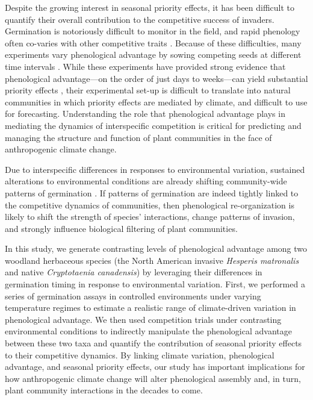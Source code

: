 \documentclass{article}[11pt]
\begin{document}
Despite the growing interest in seasonal priority effects, it has been difficult to quantify their overall contribution to the competitive success of invaders. Germination is notoriously difficult to monitor in the field, and rapid phenology often co-varies with other competitive traits \citep{Dickson2012,Milbau:2003vt,HAO:2009vh}. %
Because of these difficulties, many experiments vary phenological advantage by sowing competing seeds at different time intervals \citep{Young:2017aa}. While these experiments have provided strong evidence that phenological advantage---on the order of just days to weeks---can yield substantial priority effects \citep{Weidlich:2020aa}, their experimental set-up is difficult to translate into natural communities in which priority effects are mediated by climate, and difficult to use for forecasting. %
Understanding the role that phenological advantage plays in mediating the dynamics of interspecific competition is critical for predicting and managing the structure and function of plant communities in the face of anthropogenic climate change. 

Due  to interspecific differences in responses to environmental variation, sustained alterations to environmental conditions are already shifting community-wide patterns of germination \citep{Walck2011}. If patterns of germination are indeed tightly linked to the competitive dynamics of communities, then phenological re-organization is likely to shift the strength of species' interactions, change patterns of invasion, and strongly influence biological filtering of plant communities. 

In this study, we generate contrasting levels of phenological advantage among two woodland herbaceous species (the North American invasive \textit{Hesperis matronalis} and native \textit{Cryptotaenia canadensis}) by leveraging their differences in germination timing in response to environmental variation. First, we performed a series of germination assays in controlled environments under varying temperature regimes to estimate a realistic range of climate-driven variation in phenological advantage. %
We then used competition trials under contrasting environmental conditions to indirectly manipulate the phenological advantage between these two taxa and quantify the contribution of seasonal priority effects to their competitive dynamics. By linking climate variation, phenological advantage, and seasonal priority effects, our study has important implications for how anthropogenic climate change will alter phenological assembly and, in turn, plant community interactions in the decades to come.
\end{document}
